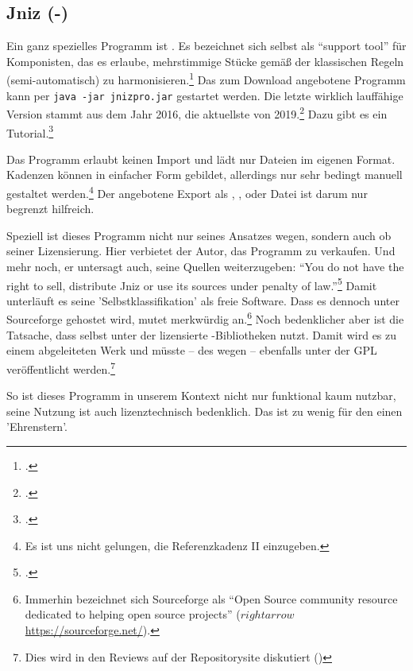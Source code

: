 %
%
%

\subsection{Jniz (-)}

\label{Jniz}Ein ganz spezielles Programm ist . Es bezeichnet sich
selbst als \enquote{support tool} für Komponisten, das es erlaube, mehrstimmige
Stücke gemäß der klassischen Regeln (semi-automatisch) zu
harmonisieren.\footcite[vgl.][\nopage wp]{Grandjean2019a} Das zum Download
angebotene Programm kann per \texttt{java -jar jnizpro.jar} gestartet werden.
Die letzte wirklich lauffähige Version stammt aus dem Jahr 2016, die aktuellste
von 2019.\footcite[vgl.][\nopage wp]{Jniz2019b} Dazu gibt es ein
Tutorial.\footcite[vgl.][\nopage wp]{Grandjean2019c}

Das Programm erlaubt keinen Import und lädt nur Dateien im eigenen Format.
Kadenzen können in einfacher Form gebildet, allerdings nur sehr bedingt manuell
gestaltet werden.\footnote{Es ist uns nicht gelungen, die Referenzkadenz II
einzugeben.} Der angebotene Export als , ,
 oder Datei ist darum nur begrenzt hilfreich.

Speziell ist dieses Programm nicht nur seines Ansatzes wegen, sondern auch ob
seiner Lizensierung. Hier verbietet der Autor, das Programm zu verkaufen. Und
mehr noch, er untersagt auch, seine Quellen weiterzugeben: \enquote{You do not
have the right to sell, distribute Jniz or use its sources under penalty of
law.}\footcite[vgl.][\nopage wp]{Grandjean2019b} Damit unterläuft es seine
'Selbstklassifikation' als freie Software. Dass es dennoch unter Sourceforge
gehostet wird, mutet merkwürdig an.\footnote{Immerhin bezeichnet sich
Sourceforge als \enquote{Open Source community resource dedicated to helping
open source projects} ($rightarrow$ \href{https://sourceforge.net/}
{https://sourceforge.net/}).} Noch bedenklicher aber ist die Tatsache, dass
 selbst unter der  lizensierte -Bibliotheken
nutzt. Damit wird es zu einem abgeleiteten Werk und müsste -- des
 wegen -- ebenfalls unter der GPL veröffentlicht
werden.\footnote{Dies wird in den Reviews auf der Repositorysite diskutiert
(\cite[vgl.][\nopage wp]{Jniz2019a})}

So ist dieses Programm in unserem Kontext nicht nur funktional kaum nutzbar,
seine Nutzung ist auch lizenztechnisch bedenklich. Das ist zu wenig für den
einen 'Ehrenstern'.



%
